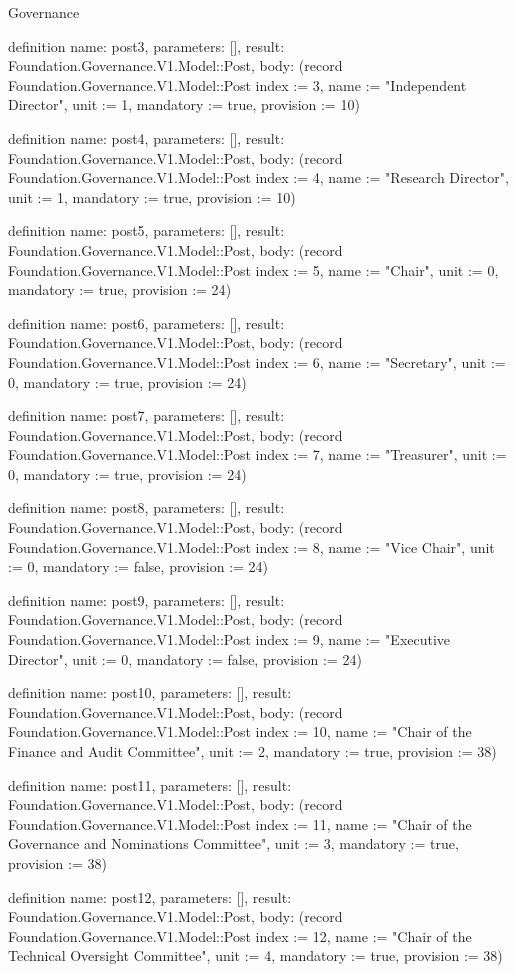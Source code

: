 \begin{lexlean}{Governance}
\begin{semanticmodule}
definition{
  name: post3,
  parameters: [],
  result: Foundation.Governance.V1.Model::Post,
  body: (record Foundation.Governance.V1.Model::Post {index := 3, name := "Independent Director", unit := 1, mandatory := true, provision := 10})
}

definition{
  name: post4,
  parameters: [],
  result: Foundation.Governance.V1.Model::Post,
  body: (record Foundation.Governance.V1.Model::Post {index := 4, name := "Research Director", unit := 1, mandatory := true, provision := 10})
}

definition{
  name: post5,
  parameters: [],
  result: Foundation.Governance.V1.Model::Post,
  body: (record Foundation.Governance.V1.Model::Post {index := 5, name := "Chair", unit := 0, mandatory := true, provision := 24})
}

definition{
  name: post6,
  parameters: [],
  result: Foundation.Governance.V1.Model::Post,
  body: (record Foundation.Governance.V1.Model::Post {index := 6, name := "Secretary", unit := 0, mandatory := true, provision := 24})
}

definition{
  name: post7,
  parameters: [],
  result: Foundation.Governance.V1.Model::Post,
  body: (record Foundation.Governance.V1.Model::Post {index := 7, name := "Treasurer", unit := 0, mandatory := true, provision := 24})
}

definition{
  name: post8,
  parameters: [],
  result: Foundation.Governance.V1.Model::Post,
  body: (record Foundation.Governance.V1.Model::Post {index := 8, name := "Vice Chair", unit := 0, mandatory := false, provision := 24})
}

definition{
  name: post9,
  parameters: [],
  result: Foundation.Governance.V1.Model::Post,
  body: (record Foundation.Governance.V1.Model::Post {index := 9, name := "Executive Director", unit := 0, mandatory := false, provision := 24})
}

definition{
  name: post10,
  parameters: [],
  result: Foundation.Governance.V1.Model::Post,
  body: (record Foundation.Governance.V1.Model::Post {index := 10, name := "Chair of the Finance and Audit Committee", unit := 2, mandatory := true, provision := 38})
}

definition{
  name: post11,
  parameters: [],
  result: Foundation.Governance.V1.Model::Post,
  body: (record Foundation.Governance.V1.Model::Post {index := 11, name := "Chair of the Governance and Nominations Committee", unit := 3, mandatory := true, provision := 38})
}

definition{
  name: post12,
  parameters: [],
  result: Foundation.Governance.V1.Model::Post,
  body: (record Foundation.Governance.V1.Model::Post {index := 12, name := "Chair of the Technical Oversight Committee", unit := 4, mandatory := true, provision := 38})
}


\end{semanticmodule}
\end{lexlean}
